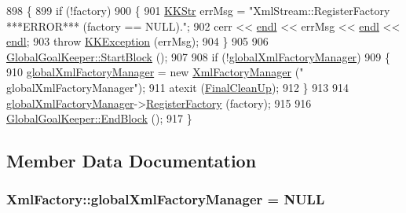 \begin{DoxyCode}
898 \{
899   \textcolor{keywordflow}{if}  (!factory)
900   \{
901     \hyperlink{class_k_k_b_1_1_k_k_str}{KKStr}  errMsg = \textcolor{stringliteral}{"XmlStream::RegisterFactory   ***ERROR***   (factory == NULL)."};
902     cerr << \hyperlink{namespace_k_k_b_ad1f50f65af6adc8fa9e6f62d007818a8}{endl} << errMsg << \hyperlink{namespace_k_k_b_ad1f50f65af6adc8fa9e6f62d007818a8}{endl} << \hyperlink{namespace_k_k_b_ad1f50f65af6adc8fa9e6f62d007818a8}{endl};
903     \textcolor{keywordflow}{throw} \hyperlink{class_k_k_b_1_1_k_k_exception}{KKException} (errMsg);
904   \}
905 
906   \hyperlink{class_k_k_b_1_1_global_goal_keeper_a05d7aab73a0cc12c01f4dd6e8d3da839}{GlobalGoalKeeper::StartBlock} ();
907 
908   \textcolor{keywordflow}{if}  (!\hyperlink{class_k_k_b_1_1_xml_factory_ae06818f5d4907c127fadd5e956f10c0b}{globalXmlFactoryManager})
909   \{
910     \hyperlink{class_k_k_b_1_1_xml_factory_ae06818f5d4907c127fadd5e956f10c0b}{globalXmlFactoryManager} = \textcolor{keyword}{new} \hyperlink{class_k_k_b_1_1_xml_factory_manager}{XmlFactoryManager} (\textcolor{stringliteral}{"
      globalXmlFactoryManager"});
911     atexit (\hyperlink{class_k_k_b_1_1_xml_factory_a8790bd65ca562a16fd0ec6927b3b344e}{FinalCleanUp});
912   \}
913 
914   \hyperlink{class_k_k_b_1_1_xml_factory_ae06818f5d4907c127fadd5e956f10c0b}{globalXmlFactoryManager}->\hyperlink{class_k_k_b_1_1_xml_factory_manager_aa7e53d487f55e36b0a224ccc3286d740}{RegisterFactory} (factory);
915 
916   \hyperlink{class_k_k_b_1_1_global_goal_keeper_a4e03a2807ca2f00c359da8625afb4cc5}{GlobalGoalKeeper::EndBlock} ();
917 \}
\end{DoxyCode}


\subsection{Member Data Documentation}
\subsubsection[{\texorpdfstring{global\+Xml\+Factory\+Manager}{globalXmlFactoryManager}}]{ Xml\+Factory\+::global\+Xml\+Factory\+Manager = N\+U\+LL\hspace{0.3cm}{\ttfamily [static]}}\hypertarget{class_k_k_b_1_1_xml_factory_ae06818f5d4907c127fadd5e956f10c0b}{}\label{class_k_k_b_1_1_xml_factory_ae06818f5d4907c127fadd5e956f10c0b}


